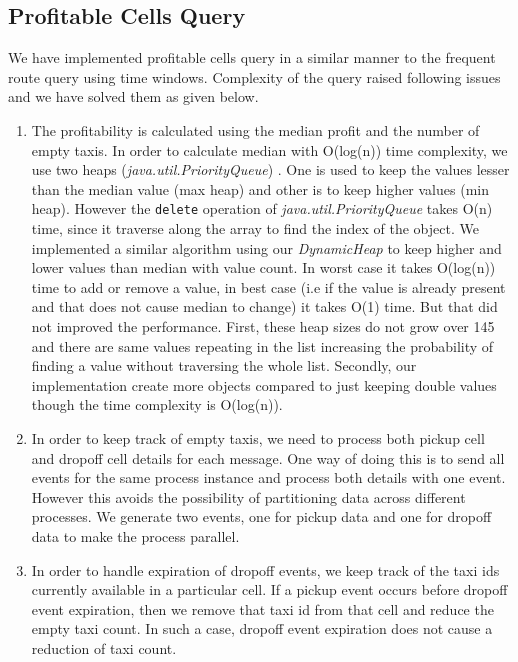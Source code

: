 \subsection{Profitable Cells Query}

We have implemented profitable cells query in a similar manner to the frequent route query using  time windows. Complexity of the query raised following issues and we have solved them as given below.
\begin{enumerate}
	\item The profitability is calculated using the median profit and the number of empty taxis. In order to calculate median with O(log(n)) time complexity, we use two heaps (\textit{java.util.PriorityQueue}) . One is used to keep the values lesser than the median value (max heap) and other is to keep higher values (min heap). However the \texttt{delete} operation of \textit{java.util.PriorityQueue} takes O(n) time, since it traverse along the array to find the index of the object. We implemented a similar algorithm using our \textit{DynamicHeap} to keep higher and lower values than median with value count. In worst case it takes O(log(n)) time to add or remove a value, in best case (i.e if the value is already present and that does not cause median to change) it takes O(1) time.  But that did not improved the performance. First, these heap sizes do not grow over 145 and there are same values repeating in the list increasing the probability of finding a value without traversing the whole list. Secondly, our implementation create more objects compared to just keeping double values though the time complexity is O(log(n)). 
	\item In order to keep track of empty taxis, we need to process both pickup cell and dropoff cell details for each message. One way of doing this is to send all events for the same process instance and process both details with one event. However this avoids the possibility of partitioning data across different processes. We generate two events, one for pickup data and one for dropoff data to make the process parallel. 
	\item In order to handle expiration of dropoff events, we keep track of the taxi ids currently available in a particular cell. If a pickup event occurs before dropoff event expiration, then we remove that taxi id from that cell and reduce the empty taxi count. In such a case, dropoff event expiration does not cause a reduction of taxi count.
\end{enumerate}

